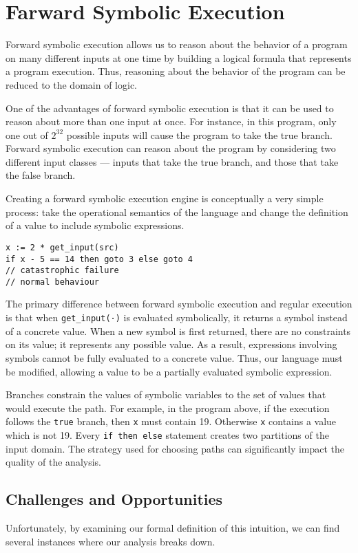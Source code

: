 \section{Farward Symbolic Execution} 
Forward symbolic execution allows us to reason about the behavior of a program on many different inputs at one time by building a logical formula that represents a program execution. Thus, reasoning about the behavior of the program can be reduced to the domain of logic.

One of the advantages of forward symbolic execution is that it can be used to reason about more than one input at once. For instance, in this program, only one out of $2^{32}$ possible inputs will cause the program to take the true branch. Forward symbolic execution can reason about the program by considering two different input classes — inputs that take the true branch, and those that take the false branch.

Creating a forward symbolic execution engine is conceptually a very simple process: take the operational semantics of the language and change the definition of a value to include symbolic expressions.

\begin{lstlisting}
x := 2 * get_input(src)
if x - 5 == 14 then goto 3 else goto 4
// catastrophic failure
// normal behaviour
\end{lstlisting}

The primary difference between forward symbolic execution and regular execution is that when \texttt{get\_input(·)} is evaluated symbolically, it returns a symbol instead of a concrete value. When a new symbol is first returned, there are no constraints on its value; it represents any possible value. As a result, expressions involving symbols cannot be fully evaluated to a concrete value. Thus, our language must be modified, allowing a value to be a partially evaluated symbolic expression.

Branches constrain the values of symbolic variables to the set of values that would execute the path. For example, in the program above, if the execution follows the \texttt{true} branch, then \texttt{x} must contain 19. Otherwise \texttt{x} contains a value which is not 19. Every \texttt{if then else} statement creates two partitions of the input domain. The strategy used for choosing paths can significantly impact the quality of the analysis.

\subsection{Challenges and Opportunities}
Unfortunately, by examining our formal definition of this intuition, we can find several instances where our analysis breaks down.

